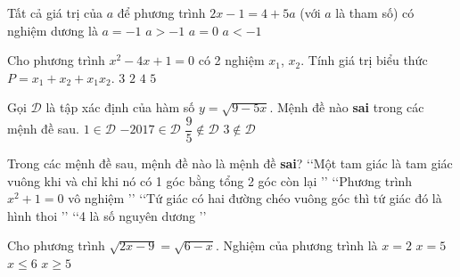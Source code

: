 \begin{ex}%
	Tất cả giá trị của $a$ để phương trình $2x-1=4+5a$ (với $a$ là tham số) có nghiệm dương là 
	\choice
	{$a=-1$}
	{\True $a>-1$}
	{$a=0$}
	{$a<-1$}
\end{ex}

\begin{ex}%
	Cho phương trình $x^2-4x+1=0$ có 2 nghiệm $x_1$, $x_2$. Tính giá trị biểu thức $P=x_1+x_2+x_1 x_2$.
	\choice
	{$3$}
	{$2$}
	{$4$}
	{\True $5$}
\end{ex}

\begin{ex}%
	Gọi $\mathscr{D}$ là tập xác định của hàm số $y=\sqrt{9-5x}$. Mệnh đề nào \textbf{sai} trong các mệnh đề sau.
	\choice
	{$1\in \mathscr{D}$}
	{$-2017\in \mathscr{D}$}
	{\True $\dfrac{9}{5}\notin \mathscr{D}$}
	{$3\notin \mathscr{D}$}
	\loigiai{
		Tập xác định của phương trình: $\mathscr{D}=\left( -\infty; \dfrac{9}{5}\right]$.\\
		Mệnh đề sai là $\dfrac{9}{5}\notin \mathscr{D}$.		
	}
\end{ex}

\begin{ex}%
	Trong các mệnh đề sau, mệnh đề nào là mệnh đề \textbf{sai}?
	\choice
	{\lq\lq Một tam giác là tam giác vuông khi và chỉ khi nó có 1 góc bằng tổng 2 góc còn lại \rq\rq}
	{\lq\lq Phương trình $x^2 +1=0$ vô nghiệm \rq\rq}
	{\True \lq\lq Tứ giác có hai đường chéo vuông góc thì tứ giác đó là hình thoi \rq\rq}
	{\lq\lq 4 là số nguyên dương \rq\rq}
\end{ex}

\begin{ex}%
	Cho phương trình $\sqrt{2x-9}=\sqrt{6-x}$. Nghiệm của phương trình là	
	\choice
	{$x=2$}
	{\True $x=5$}
	{$x\leq 6$}
	{$x\geq 5$}
\end{ex}

